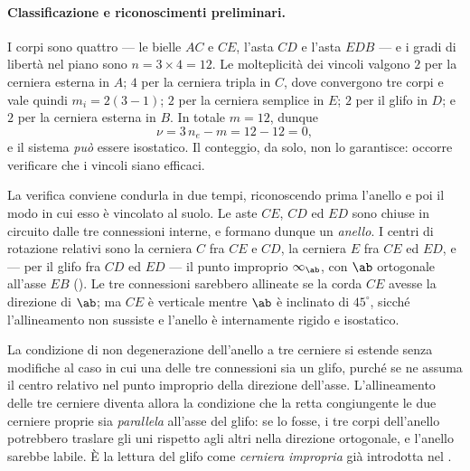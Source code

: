 \begin{esercizio}
	
	
	\begin{svolgimento}
		
		\paragraph{Classificazione e riconoscimenti preliminari.}
		
		I corpi sono quattro --- le bielle $AC$ e $CE$, l'asta $CD$ e l'asta
		$EDB$ --- e i gradi di libertà nel piano sono $n = 3 \times 4 = 12$.
		Le molteplicità dei vincoli valgono $2$ per la cerniera esterna in
		$A$; $4$ per la cerniera tripla in $C$, dove convergono tre corpi e
		vale quindi $m_i = 2(3-1)$; $2$ per la cerniera semplice in $E$; $2$
		per il glifo in $D$; e $2$ per la cerniera esterna in $B$. In totale
		$m = 12$, dunque
		\[
		\nu = 3\,n_e - m = 12 - 12 = 0 ,
		\]
		e il sistema \emph{può} essere isostatico. Il conteggio, da solo, non
		lo garantisce: occorre verificare che i vincoli siano efficaci.
		
		La verifica conviene condurla in due tempi, riconoscendo prima
		l'anello e poi il modo in cui esso è vincolato al suolo. Le aste
		$CE$, $CD$ ed $ED$ sono chiuse in circuito dalle tre connessioni
		interne, e formano dunque un \emph{anello}. I centri di rotazione
		relativi sono la cerniera $C$ fra $CE$ e $CD$, la cerniera $E$ fra
		$CE$ ed $ED$, e --- per il glifo fra $CD$ ed $ED$ --- il punto
		improprio $\infty_{\ab}$, con $\ab$ ortogonale all'asse $EB$
		(). Le tre connessioni sarebbero allineate se la
		corda $CE$ avesse la direzione di $\ab$; ma $CE$ è verticale mentre
		$\ab$ è inclinato di $45^{\circ}$, sicché l'allineamento non
		sussiste e l'anello è internamente rigido e isostatico.
		
		\begin{oss}
			La condizione di non degenerazione dell'anello a tre cerniere si
			estende senza modifiche al caso in cui una delle tre connessioni
			sia un glifo, purché se ne assuma il centro relativo nel punto
			improprio della direzione dell'asse. L'allineamento delle tre
			cerniere diventa allora la condizione che la retta congiungente
			le due cerniere proprie sia \emph{parallela} all'asse del glifo:
			se lo fosse, i tre corpi dell'anello potrebbero traslare gli uni
			rispetto agli altri nella direzione ortogonale, e l'anello
			sarebbe labile. È la lettura del glifo come \emph{cerniera
				impropria} già introdotta nel .
		\end{oss}
		

\end{svolgimento}
\end{esercizio}
